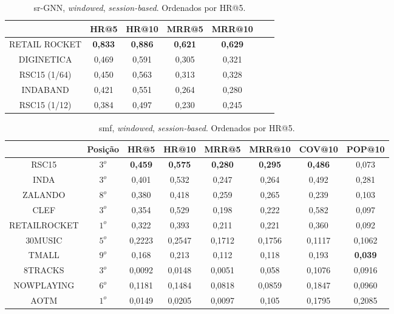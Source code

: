 \begin{table}
    \centering
    \vspace{1mm}
    \begin{tabular}{ccccccc}
    \hline
     & HR@5 & HR@10 & MRR@5 & MRR@10 \\
    \hline
    RETAIL ROCKET & \textbf{0,833} & \textbf{0,886} & \textbf{0,621} & \textbf{0,629} & \\
    DIGINETICA & 0,469 & 0,591 & 0,305 & 0,321 & \\
    RSC15 (1/64) & 0,450 & 0,563 & 0,313 & 0,328 & \\
    INDABAND & 0,421 & 0,551 & 0,264 & 0,280 &  \\
    RSC15 (1/12) & 0,384 & 0,497 & 0,230 & 0,245 & \\
    \hline
    \end{tabular}
    \caption{sr-GNN, \textit{windowed}, \textit{session-based}. Ordenados por HR@5.}
    \label{tab:gnn}
    \end{table}


    \begin{table}
        \centering
        \vspace{1mm}
        \begin{tabular}{cccccccc}
        \hline
        &Posição& HR@5 & HR@10 & MRR@5 & MRR@10 & COV@10 & POP@10 \\
        \hline
        RSC15& $3^o$ & \textbf{0,459} & \textbf{0,575} & \textbf{0,280} & \textbf{0,295} & \textbf{0,486} & 0,073 \\
        INDA& $3^o$ & 0,401 & 0,532 & 0,247 & 0,264 & 0,492 & 0,281 \\
        ZALANDO& $8^o$& 0,380 & 0,418 & 0,259 & 0,265 & 0,239 & 0,103 \\
        CLEF& $3^o$ & 0,354 & 0,529 & 0,198 & 0,222 & 0,582 & 0,097\\
        RETAILROCKET& $1^o$ & 0,322 & 0,393 & 0,211 & 0,221 & 0,360 & 0,092 \\
        30MUSIC& $5^o$ & 0,2223 & 0,2547 & 0,1712 & 0,1756 & 0,1117 & 0,1062 \\
        TMALL& $9^o$& 0,168 &  0,213 & 0,112 & 0,118 & 0,193 & \textbf{0,039} \\
        8TRACKS& $3^o$ & 0,0092 & 0,0148  & 0,0051 & 0,058 & 0,1076 & 0,0916 \\
        NOWPLAYING& $6^o$ & 0,1181 & 0,1484 & 0,0818 & 0,0859 & 0,1847 & 0,0960\\
        AOTM& $1^o$ & 0,0149 & 0,0205 & 0,0097 & 0,105 & 0,1795 & 0,2085\\
        \hline
        \end{tabular}
        \caption{smf, \textit{windowed}, \textit{session-based}. Ordenados por HR@5.}
        \label{tab:smf}
        \end{table}